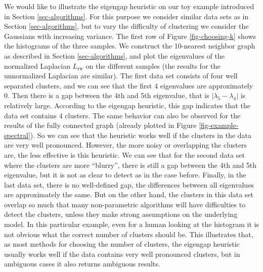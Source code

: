 \documentclass{article}
\newcommand{\Lrw}{L_{\text{rw}}}
\begin{document}
%
We would like to illustrate the eigengap heuristic on our toy example
introduced in Section \ref{sec-algorithms}. For this purpose we
consider similar data sets as in Section \ref{sec-algorithms}, but to
vary the difficulty of clustering we consider the Gaussians with
increasing variance. The first row of Figure \ref{fig-choosing-k}
shows the histograms of the three samples. We construct the 10-nearest
neighbor graph as described in Section \ref{sec-algorithms}, and plot
the eigenvalues  of the normalized Laplacian $\Lrw$ on
the different samples (the results for the unnormalized Laplacian are
similar). The first data set consists of four well separated clusters,
and we can see that the first 4 eigenvalues are approximately 0. Then
there is a gap between the 4th and 5th eigenvalue, that is $|\lambda_5 -
\lambda_4|$ is relatively large.  According to the eigengap heuristic,
this gap indicates that the data set contains 4 clusters. The same
behavior can also be observed for the results of the fully connected
graph (already plotted in Figure \ref{fig-example-spectral}). So we
can see that the heuristic works well if the clusters in the data are
very well pronounced.
%
However, the more noisy or overlapping the clusters are, the less
effective is this heuristic.  We can see that for the second data set
where the clusters are more ``blurry'', there is still a gap between
the 4th and 5th eigenvalue, but it is not as clear to detect as in the
case before.  Finally, in the last data set, there is no well-defined
gap, the differences between all eigenvalues are approximately the
same. But on the other hand, the clusters in this data set overlap so
much that many non-parametric algorithms will have difficulties to
detect the clusters, unless they make strong assumptions on the underlying
model. In this particular example, even for a human looking at the
histogram it is not obvious what the correct number of clusters should
be.  This illustrates that, as most methods for choosing the number of
clusters, the eigengap heuristic usually works well if the data
contains very well pronounced clusters, but in ambiguous cases it also
returns ambiguous results.\\
\end{document}
